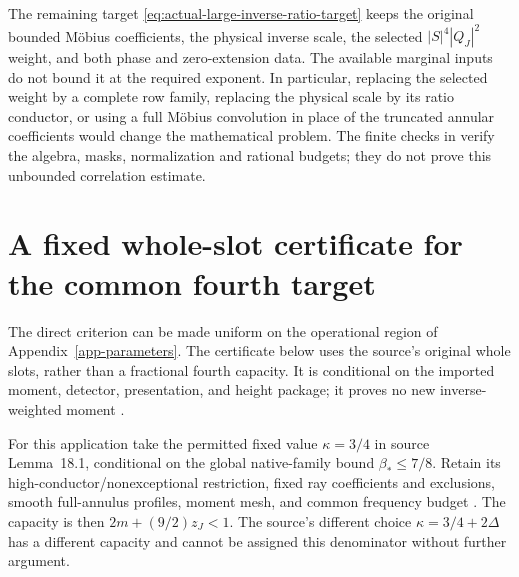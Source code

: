 \documentclass[11pt]{article}
\theoremstyle{definition}
\begin{document}
The remaining target \eqref{eq:actual-large-inverse-ratio-target} keeps
the original bounded Möbius coefficients, the physical inverse scale,
the selected \(|S|^4|Q_J|^2\) weight, and both phase and zero-extension
data.  The available marginal inputs do not bound it at the required
exponent.  In particular, replacing the selected weight by a complete
row family, replacing the physical scale by its ratio conductor, or
using a full Möbius convolution in place of the truncated annular
coefficients would change the mathematical problem.  The finite
checks in \cite{n6,n7} verify the algebra, masks, normalization and
rational budgets; they do not prove this unbounded correlation estimate.

\section{A fixed whole-slot certificate for the common fourth target}
\label{sec:whole-slot-certificate}

The direct criterion can be made uniform on the operational region of
Appendix~\ref{app-parameters}.  The certificate below uses the source's
original whole slots, rather than a fractional fourth capacity.  It is
conditional on the imported moment, detector, presentation, and height
package; it proves no new inverse-weighted moment \cite{n9,n19,n20}.

For this application take the permitted fixed value $\kappa=3/4$ in
source Lemma~18.1, conditional on the global native-family bound
$\beta_*\le7/8$.  Retain its high-conductor/nonexceptional restriction,
fixed ray coefficients and exclusions, smooth full-annulus profiles,
moment mesh, and common frequency budget \cite{source-primary}.
The capacity is then $2m+(9/2)z_J<1$.  The source's different choice
$\kappa=3/4+2\Delta$ has a different capacity and cannot be assigned
this denominator without further argument.
\end{document}
